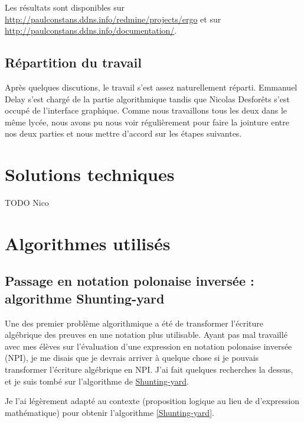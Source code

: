 \documentclass[12pt, algo]{cours}
\begin{document}
Les résultats sont disponibles sur \url{http://paulconstans.ddns.info/redmine/projects/ergo} et sur \url{http://paulconstans.ddns.info/documentation/}.

\subsection{Répartition du travail}

Après quelques discutions, le travail s'est assez naturellement réparti. Emmanuel Delay s'est chargé de la partie algorithmique tandis que Nicolas Desforêts s'est occupé de l'interface graphique. Comme nous travaillons tous les deux dans le même lycée, nous avons pu nous voir régulièrement pour faire la jointure entre nos deux parties et nous mettre d'accord sur les étapes suivantes.

\section{Solutions techniques}

TODO Nico

\section{Algorithmes utilisés}

\subsection{Passage en notation polonaise inversée : algorithme Shunting-yard}

Une des premier problème algorithmique a été de transformer l'écriture algébrique des preuves en une notation plus utilisable. Ayant pas mal travaillé avec mes élèves sur l'évaluation d'une expression en notation polonaise inversée (NPI), je me disais que je devrais arriver à quelque chose si je pouvais transformer l'écriture algébrique en NPI. J'ai fait quelques recherches la dessus, et je suis tombé sur l'algorithme de \href{https://fr.wikipedia.org/wiki/Algorithme_Shunting-yard}{Shunting-yard}.

Je l'ai légèrement adapté au contexte (proposition logique au lieu de d'expression mathématique) pour obtenir l'algorithme \ref{Shunting-yard}.
\end{document}
